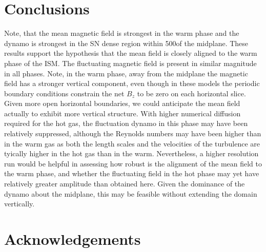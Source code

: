 \documentclass[useAMS,usenatbib]{mn2e}
\begin{document}
\section{Conclusions}
Note, that the mean magnetic field is strongest in the warm phase and the 
dynamo is strongest in the SN dense region within 500\pc of the midplane. 
These results support the hypothesis that the mean field is closely aligned to the warm phase of the ISM.
The fluctuating magnetic field is present in similar magnitude in all phases.
Note, in the warm phase, away from the midplane the magnetic field has a 
stronger vertical component, even though in these models the periodic boundary
conditions constrain the net $B_z$ to be zero on each horizontal slice. 
Given more open horizontal boundaries, we could anticipate the mean field 
actually to exhibit more vertical structure. 
With higher numerical diffusion required for the hot gas, the fluctuation 
dynamo in this phase may have been relatively suppressed, although the 
Reynolds numbers may have been higher than in the warm gas as both the length
scales and the velocities of the turbulence are tyically higher in the hot gas
than in the warm.
Nevertheless, a higher resolution run would be helpful in assessing how robust
is the alignment of the mean field to the warm phase, and whether the
fluctuating field in the hot phase may yet have relatively greater amplitude
than obtained here.
Given the dominance of the dynamo about the midplane, this may be feasible
without extending the domain vertically.


\newpage
\section*{Acknowledgements}
  
  \label{lastpage}

\label{lastpage}
\end{document}

